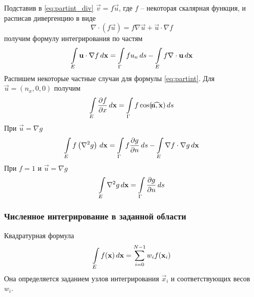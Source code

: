 Подставив в \cref{eq:partint_div} $\vec v = f\vec u$, где $f$ -- некоторая скалярная функция, и 
расписав дивергенцию в виде
$$\nabla\cdot(f\vec u) = f\nabla\vec u + \vec u \cdot \nabla f$$
получим формулу интегрирования по частям
\begin{equation}
\label{eq:partint}
\arint{\vec u \cdot \nabla f}{E}{\vec x} = \arint{f u_n}{\Gamma}{s} - \arint{f\nabla\cdot \vec u}{E}{\vec x}
\end{equation}
Распишем некоторые частные случаи для формулы \cref{eq:partint}.
Для $\vec u = (n_x, 0, 0)$ получим
\begin{equation}
\label{eq:partint_ugrad_}
\arint{\dfr{f}{x}}{E}{\vec x} = \arint{f \cos(\vecangle{n}{x})}{\Gamma}{s}
\end{equation}
При $\vec u = \nabla g$
\begin{equation}
\label{eq:partint_laplace_fg}
\arint{f\left(\nabla^2 g \right)}{E}{\vec x} = \arint{f\dfr{g}{n}}{\Gamma}{s} - \arint{\nabla f \cdot \nabla g}{E}{\vec x}
\end{equation}
При $f=1$ и $\vec u = \nabla g$
\begin{equation}
\label{eq:partint_laplace}
\arint{\nabla^2 g}{E}{\vec x} = \arint{\dfr{g}{n}}{\Gamma}{s}
\end{equation}

\subsubsection{Численное интегрирование в заданной области}
Квадратурная формула
\begin{equation}
\label{eq:quadrature_formula}
\arint{f(\vec x)}{E}{\vec x} = \sum_{i=0}^{N-1} w_i f(\vec x_i)
\end{equation}
Она определяется заданием узлов интегрирования $\vec x_i$ 
и соответствующих весов $w_i$.
